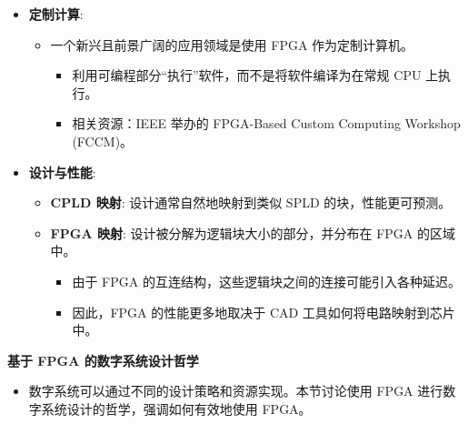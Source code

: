 \documentclass[
  ignorenonframetext,
  chinese,
]{beamer}
\providecommand{\tightlist}{%
  \setlength{\itemsep}{0pt}\setlength{\parskip}{0pt}}
\begin{document}
\begin{frame}
\begin{itemize}
\tightlist
\item
  \textbf{定制计算}:

  \begin{itemize}
  \tightlist
  \item
    一个新兴且前景广阔的应用领域是使用 FPGA 作为定制计算机。

    \begin{itemize}
    \tightlist
    \item
      利用可编程部分``执行''软件，而不是将软件编译为在常规 CPU 上执行。
    \item
      相关资源：IEEE 举办的 FPGA-Based Custom Computing Workshop
      (FCCM)。
    \end{itemize}
  \end{itemize}
\item
  \textbf{设计与性能}:

  \begin{itemize}
  \tightlist
  \item
    \textbf{CPLD 映射}: 设计通常自然地映射到类似 SPLD
    的块，性能更可预测。
  \item
    \textbf{FPGA 映射}: 设计被分解为逻辑块大小的部分，并分布在 FPGA
    的区域中。

    \begin{itemize}
    \tightlist
    \item
      由于 FPGA 的互连结构，这些逻辑块之间的连接可能引入各种延迟。
    \item
      因此，FPGA 的性能更多地取决于 CAD 工具如何将电路映射到芯片中。
    \end{itemize}
  \end{itemize}
\end{itemize}
\end{frame}

\begin{frame}
\begin{block}{\textbf{基于 FPGA 的数字系统设计哲学}}
\label{ux57faux4e8e-fpga-ux7684ux6570ux5b57ux7cfbux7edfux8bbeux8ba1ux54f2ux5b66}
\begin{itemize}
\tightlist
\item
  数字系统可以通过不同的设计策略和资源实现。本节讨论使用 FPGA
  进行数字系统设计的哲学，强调如何有效地使用 FPGA。
\end{itemize}
\end{block}
\end{frame}
\end{document}

